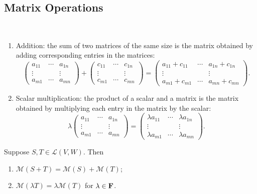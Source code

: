 \subsection{Matrix Operations}
\begin{definition} \
\begin{enumerate}[label=(\roman*)]
\item Addition: the sum of two matrices of the same size is the matrix obtained by adding corresponding entries in the matrices:
\[\begin{pmatrix}
a_{11}&\cdots&a_{1n}\\
\vdots&&\vdots\\
a_{m1}&\cdots&a_{mn}
\end{pmatrix}+
\begin{pmatrix}
c_{11}&\cdots&c_{1n}\\
\vdots&&\vdots\\
c_{m1}&\cdots&c_{mn}
\end{pmatrix}=
\begin{pmatrix}
a_{11}+c_{11}&\cdots&a_{1n}+c_{1n}\\
\vdots&&\vdots\\
a_{m1}+c_{m1}&\cdots&a_{mn}+c_{mn}
\end{pmatrix}.\]

\item Scalar multiplication: the product of a scalar and a matrix is the matrix obtained by multiplying each entry in the matrix by the scalar:
\[\lambda\begin{pmatrix}
a_{11}&\cdots&a_{1n}\\
\vdots&&\vdots\\
a_{m1}&\cdots&a_{mn}
\end{pmatrix}=
\begin{pmatrix}
\lambda a_{11}&\cdots&\lambda a_{1n}\\
\vdots&&\vdots\\
\lambda a_{m1}&\cdots&\lambda a_{mn}
\end{pmatrix}.\]
\end{enumerate}
\end{definition}

\begin{proposition}
Suppose $S,T\in\mathcal{L}(V,W)$. Then
\begin{enumerate}[label=(\roman*)]
\item $\mathcal{M}(S+T)=\mathcal{M}(S)+\mathcal{M}(T)$;
\item $\mathcal{M}(\lambda T)=\lambda\mathcal{M}(T)$ for $\lambda\in\mathbf F$.
\end{enumerate}
\end{proposition}


